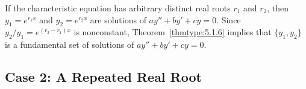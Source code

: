 \documentclass{ximera}
\begin{document}
 
If the characteristic equation has arbitrary distinct real roots
$r_1$ and $r_2$, then
$y_1=e^{r_1x}$ and $y_2=e^{r_2x}$  are  solutions of $ay''+by'+cy=0$.
Since $y_2/y_1=e^{(r_2-r_1)x}$ is nonconstant, Theorem~\ref{thmtype:5.1.6}
 implies that  $\{y_1,y_2\}$ is a fundamental
set of solutions of $ay''+by'+cy=0$.
 
\subsection*{Case 2: A Repeated Real Root}
 
\end{document}
